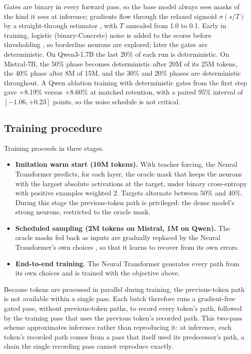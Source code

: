 \documentclass[10pt,twocolumn,letterpaper]{article}
\begin{document}
Gates are binary in every forward pass, so the base model always sees masks of the kind it sees at inference; gradients flow through the relaxed sigmoid $\sigma(s/T)$ by a straight-through estimator \citep{bengio2013ste}, with $T$ annealed from 1.0 to 0.1. Early in training, logistic (binary-Concrete) noise is added to the scores before thresholding \citep{jang2017gumbel}, so borderline neurons are explored; later the gates are deterministic. On Qwen3-1.7B the last 20\% of each run is deterministic. On Mistral-7B, the 50\% phase becomes deterministic after 20M of its 25M tokens, the 40\% phase after 8M of 15M, and the 30\% and 20\% phases are deterministic throughout. A Qwen ablation training with deterministic gates from the first step gave +8.19\% versus +8.60\% at matched retention, with a paired 95\% interval of $[-1.06, +0.23]$ points, so the noise schedule is not critical.

\subsection{Training procedure}

Training proceeds in three stages.
\begin{itemize}
\item \textbf{Imitation warm start (10M tokens).} With teacher forcing, the Neural Transformer predicts, for each layer, the oracle mask that keeps the neurons with the largest absolute activations at the target, under binary cross-entropy with positive examples weighted 2. Targets alternate between 50\% and 40\%. During this stage the previous-token path is privileged: the dense model's strong neurons, restricted to the oracle mask.
\item \textbf{Scheduled sampling (2M tokens on Mistral, 1M on Qwen).} The oracle masks fed back as inputs are gradually replaced by the Neural Transformer's own choices \citep{bengio2015scheduled}, so that it learns to recover from its own errors.
\item \textbf{End-to-end training.} The Neural Transformer generates every path from its own choices and is trained with the objective above.
\end{itemize}
Because tokens are processed in parallel during training, the previous-token path is not available within a single pass. Each batch therefore runs a gradient-free gated pass, without previous-token paths, to record every token's path, followed by the training pass that uses the previous token's recorded path. This two-pass scheme approximates inference rather than reproducing it: at inference, each token's recorded path comes from a pass that itself used its predecessor's path, a chain the single recording pass cannot reproduce exactly.
\end{document}
